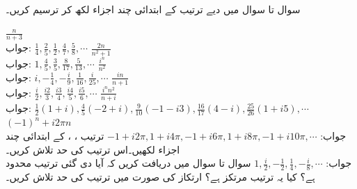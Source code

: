 سوال  تا سوال  میں دیے ترتیب کے ابتدائی چند اجزاء لکھ کر ترسیم کریں۔

\quad
$\tfrac{n}{n+3}$\\
جواب:\quad
$\tfrac{1}{4},\tfrac{2}{5},\tfrac{1}{2},\tfrac{4}{7},\tfrac{5}{8},\cdots$
\quad
$\tfrac{2n}{n^2+1}$\\
جواب:\quad
$1,\tfrac{4}{5},\tfrac{3}{5},\tfrac{8}{17},\tfrac{5}{13},\cdots$
\quad
$\tfrac{i^n}{n^2}$\\
جواب:\quad
$i,-\tfrac{1}{4},-\tfrac{i}{9},\tfrac{1}{16},\tfrac{i}{25},\cdots$
\quad
$\tfrac{in}{n+1}$\\
جواب:\quad
$\tfrac{i}{2},\tfrac{i2}{3},\tfrac{i3}{4},\tfrac{i4}{5},\tfrac{i5}{6},\cdots$
\quad
$\tfrac{i^n n^2}{n+i}$\\
جواب:\quad
$\tfrac{1}{2}(1+i),\tfrac{4}{5}(-2+i),\tfrac{9}{10}(-1-i3),\tfrac{16}{17}(4-i),\tfrac{25}{26}(1+i5),\cdots$
\quad
$(-1)^n+i2\pi n$\\
جواب:\quad
$-1+i2\pi, 1+i4\pi,-1+i6\pi, 1+i8\pi, -1+i10\pi,\cdots$
\quad
ترتیب ، ،  کے ابتدائی چند اجزاء لکھیں۔اس ترتیب  کی حد تلاش کریں۔\\
جواب:\quad
$1,\tfrac{i}{2}, -\tfrac{1}{2},\tfrac{1}{4}, -\tfrac{i}{8},\cdots$
سوال  تا سوال  میں دریافت کریں کہ آیا دی گئی ترتیب محدود ہے؟ کیا یہ ترتیب مرتکز ہے؟ ارتکاز کی صورت میں ترتیب کی حد تلاش کریں۔
  
